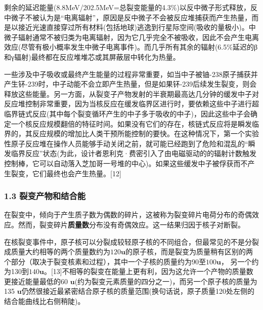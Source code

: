 剩余的延迟能量(8.8MeV/202.5MeV=总裂变能量的4.3\%)以反中微子形式释放，反中微子不被认为是“电离辐射”，原因是反中微子不会被反应堆捕获而产生热量，而是以接近光速直接穿过所有材料(包括地球)逃逸到行星际空间(吸收的量极小)。中微子辐射通常不被归类为电离辐射，因为它几乎完全不被吸收，因此不会产生电离效应(尽管有极小概率发生中微子电离事件)。而几乎所有其余的辐射(6.5\%延迟的β和γ辐射)最终都在反应堆堆芯或其屏蔽层中转化为热量。

一些涉及中子吸收或最终产生能量的过程非常重要，如当中子被铀-238原子捕获并产生钚-239时，中子动能不会立即产生热量，但是如果钚-239后续发生裂变，则会释放这些能量。另一方面，从裂变子产物发射的半衰期最高达几分钟的缓发中子对反应堆控制非常重要，因为当核反应在缓发临界区进行时，要依赖这些中子进行超临界链式反应(其中每个裂变循环产生的中子多于吸收的中子)，因此这些中子会确定一个核反应规模翻倍的特征时间。如果没有它们的存在，核链式反应将是瞬发临界的，其反应规模的增加比人类干预所能控制的要快。在这种情况下，第一个实验性原子反应堆在操作人员能够手动关闭之前，就可能已经跑到了危险和混乱的“瞬发临界反应”状态(为此，设计者恩利克·费密引入了由电磁驱动的的辐射计数触发控制棒，它可以自动落入芝加哥一号堆的中心)。如果这些缓发中子被俘获而不产生裂变，它们最终也会产生热量。[12]

\subsubsection{1.3 裂变产物和结合能}
在裂变中，倾向于产生质子数为偶数的碎片，这被称为裂变碎片电荷分布的奇偶效应。然而，裂变碎片\textbf{质量数}分布没有奇偶效应。这一结果归因于核子对断裂。

在核裂变事件中，原子核可以分裂成较轻原子核的不同组合，但最常见的不是分裂成质量大约相等的两个质量数约为$120\mathbf{u}$的原子核，而是裂变为质量稍有区别的两个部分（取决于裂变核素和过程），其中一个子核的质量约为90至$100\mathbf{u}$， 另一个约为130到$140\mathbf{u}$。[13]不相等的裂变在能量上更有利，因为这允许一个产物的质量数更接近能量最低的60 $\mathbf{u}$(约为裂变元素质量的四分之一)，而另一个原子核的质量为135 $\mathbf{u}$仍然很接近最紧密结合原子核的质量范围(换句话说，原子质量120处左侧的结合能曲线比右侧稍陡)。

